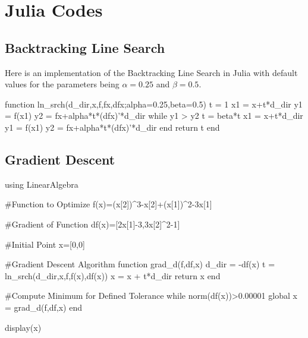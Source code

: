 
\chapter{Julia Codes}

\section{Backtracking Line Search}
Here is an implementation of the Backtracking Line Search in Julia with default values for the parameters being $\alpha=0.25$ and $\beta=0.5$.
\begin{jllisting}
	function ln_srch(d_dir,x,f,fx,dfx;alpha=0.25,beta=0.5)
	t = 1
	x1 = x+t*d_dir
	y1 = f(x1)
	y2 = fx+alpha*t*(dfx)'*d_dir
	while y1 > y2
	t = beta*t
	x1 = x+t*d_dir
	y1 = f(x1)
	y2 = fx+alpha*t*(dfx)'*d_dir
	end
	return t
	end
\end{jllisting}

\section{Gradient Descent}
\begin{jllisting}
	using LinearAlgebra
	
	#Function to Optimize
	f(x)=(x[2])^3-x[2]+(x[1])^2-3x[1]
	
	#Gradient of Function
	df(x)=[2x[1]-3,3x[2]^2-1]
	
	#Initial Point
	x=[0,0]
	
	#Gradient Descent Algorithm
	function grad_d(f,df,x)
	d_dir = -df(x)
	t = ln_srch(d_dir,x,f,f(x),df(x))
	x = x + t*d_dir
	return x
	end
	
	#Compute Minimum for Defined Tolerance
	while norm(df(x))>0.00001
	global x = grad_d(f,df,x)
	end
	
	display(x)
	
\end{jllisting}